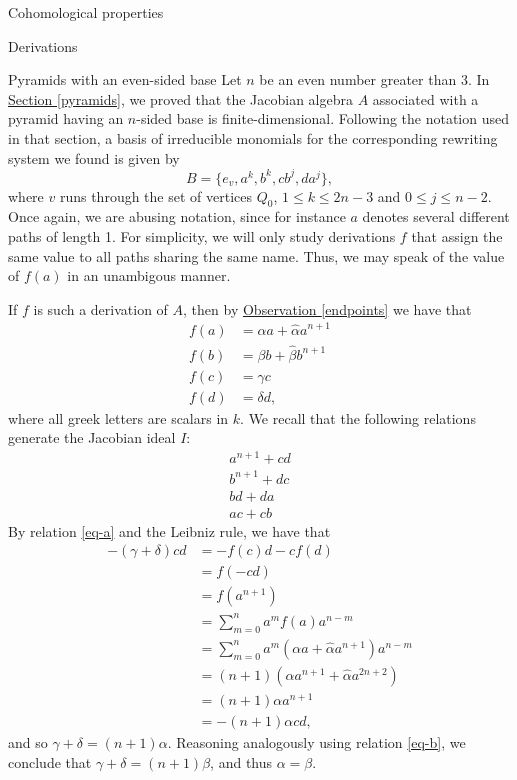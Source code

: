 \begin{chapter}{Cohomological properties}
\begin{section}{Derivations}
\begin{subsection}{Pyramids with an even-sided base}
Let $n$ be an even number greater than 3. In \hyperref[pyramids]{Section \ref*{pyramids}}, we proved that the Jacobian algebra $A$ associated with a pyramid having an $n$-sided base is finite-dimensional. Following the notation used in that section, a basis of irreducible monomials for the corresponding rewriting system we found is given by
\[B=\{e_v,a^k,b^k,cb^j, da^j\},\] 
where $v$ runs through the set of vertices $Q_0$, $1\leq k\leq 2n-3$ and $0\leq j\leq n-2$. Once again, we are abusing notation, since for instance $a$ denotes several different paths of length 1. For simplicity, we will only study derivations $f$ that assign the same value to all paths sharing the same name. Thus, we may speak of the value of $f(a)$ in an unambigous manner.

If $f$ is such a derivation of $A$, then by \hyperref[endpoints]{Observation \ref*{endpoints}} we have that
\begin{equation}
\begin{aligned}
\label{pyramid-equations}
f(a) &= \alpha a + \hat\alpha a^{n+1}\\
f(b) &= \beta b + \hat\beta b^{n+1}\\
f(c) &= \gamma c \\
f(d) &= \delta d,
\end{aligned}
\end{equation}
where all greek letters are scalars in $k$. We recall that the following relations generate the Jacobian ideal $I$:
\begin{align}
a^{n+1}+cd \label{eq-a}\\
b^{n+1}+dc \label{eq-b}\\
bd+da \label{eq-c}\\
ac+cb \label{eq-d}
\end{align}
By relation \eqref{eq-a} and the Leibniz rule, we have that
\begin{align*}-(\gamma+\delta)cd&= -f(c)d - cf(d)\\
&= f(-cd)\\
&=f(a^{n+1})\\
&=\sum_{m=0}^{n} a^mf(a)a^{n-m}\\
&=\sum_{m=0}^{n} a^m(\alpha a + \hat\alpha a^{n+1}) a^{n-m}\\
&=(n+1)(\alpha a^{n+1} + \hat\alpha a^{2n+2})\\
&=(n+1)\alpha a^{n+1}\\
&=-(n+1)\alpha cd,
\end{align*}
and so $\gamma+\delta = (n+1)\alpha$. Reasoning analogously using relation \eqref{eq-b}, we conclude that $\gamma+\delta = (n+1)\beta$, and thus $\alpha=\beta$.


\end{subsection}
\end{section}
\end{chapter}
